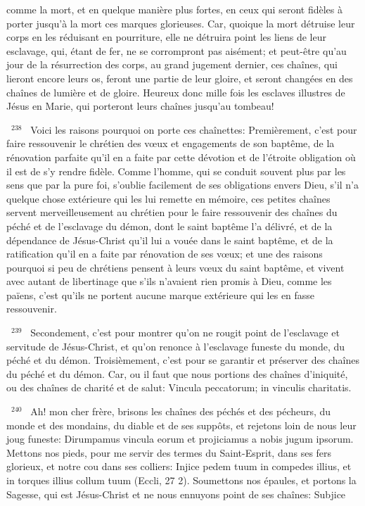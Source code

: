 \documentclass[paper=a5,pagesize=pdftex,fontsize=15pt,headinclude=on,twoside=off]{scrbook}
\newcommand{\negphantom}[1]{\settowidth{\dimen0}{#1}\hspace*{-\dimen0}}
\newcommand{\versenb}[1]{\par \vspace{10pt}~\negphantom{~${}^{#1}$~}${}^{#1}$~}
\begin{document}
comme la mort, et en quelque manière plus fortes, en ceux qui seront fidèles à porter jusqu'à la mort ces marques
glorieuses. Car, quoique la mort détruise leur corps en les réduisant en pourriture, elle ne détruira point les liens de
leur esclavage, qui, étant de fer, ne se corrompront pas aisément; et peut-être qu'au jour de la résurrection des
corps, au grand jugement dernier, ces chaînes, qui lieront encore leurs os, feront une partie de leur gloire, et
seront changées en des chaînes de lumière et de gloire. Heureux donc mille fois les esclaves illustres de Jésus en
Marie, qui porteront leurs chaînes jusqu'au tombeau!
\versenb{238} Voici les raisons pourquoi on porte ces chaînettes:
Premièrement, c'est pour faire ressouvenir le chrétien des vœux et engagements de son baptême, de la
rénovation parfaite qu'il en a faite par cette dévotion et de l'étroite obligation où il est de s'y rendre fidèle. Comme
l'homme, qui se conduit souvent plus par les sens que par la pure foi, s'oublie facilement de ses obligations envers
Dieu, s'il n'a quelque chose extérieure qui les lui remette en mémoire, ces petites chaînes servent
merveilleusement au chrétien pour le faire ressouvenir des chaînes du péché et de l'esclavage du démon, dont le
saint baptême l'a délivré, et de la dépendance de Jésus-Christ qu'il lui a vouée dans le saint baptême, et de la
ratification qu'il en a faite par rénovation de ses vœux; et une des raisons pourquoi si peu de chrétiens pensent à
leurs vœux du saint baptême, et vivent avec autant de libertinage que s'ils n'avaient rien promis à Dieu, comme
les païens, c'est qu'ils ne portent aucune marque extérieure qui les en fasse ressouvenir.
\versenb{239} Secondement, c'est pour montrer qu'on ne rougit point de l'esclavage et servitude de Jésus-Christ, et qu'on
renonce à l'esclavage funeste du monde, du péché et du démon.
Troisièmement, c'est pour se garantir et préserver des chaînes du péché et du démon. Car, ou il faut que nous
portions des chaînes d'iniquité, ou des chaînes de charité et de salut: Vincula peccatorum; in vinculis charitatis.
\versenb{240} Ah! mon cher frère, brisons les chaînes des péchés et des pécheurs, du monde et des mondains, du diable
et de ses suppôts, et rejetons loin de nous leur joug funeste: Dirumpamus vincula eorum et projiciamus a nobis
jugum ipsorum. Mettons nos pieds, pour me servir des termes du Saint-Esprit, dans ses fers glorieux, et notre cou
dans ses colliers: Injice pedem tuum in compedes illius, et in torques illius collum tuum (Eccli, 27 2). Soumettons
nos épaules, et portons la Sagesse, qui est Jésus-Christ et ne nous ennuyons point de ses chaînes: Subjice
\end{document}
